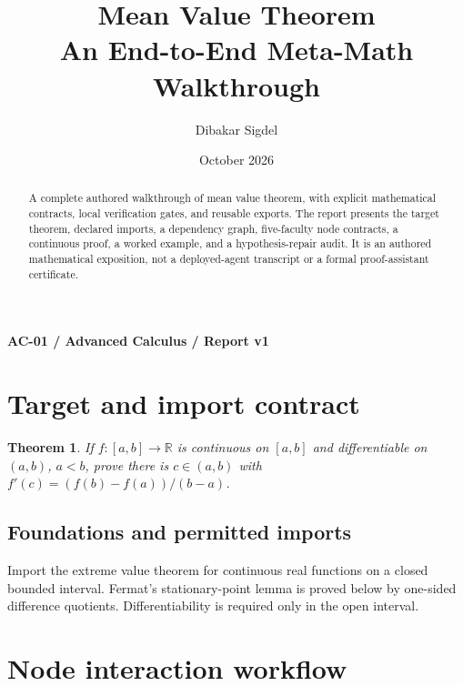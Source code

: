 \documentclass[preprint,12pt,aps,pra,showkeys,amsmath,amssymb,superscriptaddress,floatfix]{revtex4-2}
\newtheorem{theorem}{Theorem}[section]
\theoremstyle{definition}
\theoremstyle{remark}
\begin{document}
\title{Mean Value Theorem\\[4pt]\large An End-to-End Meta-Math Walkthrough}

\author{Dibakar Sigdel}


\date{October 2026}

\begin{abstract}

A complete authored walkthrough of mean value theorem, with explicit
mathematical contracts, local verification gates, and reusable exports.
The report presents the target theorem, declared imports, a dependency
graph, five-faculty node contracts, a continuous proof, a worked
example, and a hypothesis-repair audit. It is an authored mathematical
exposition, not a deployed-agent transcript or a formal proof-assistant
certificate.

\end{abstract}\maketitle\linespread{1.12}\selectfont

\noindent\textbf{AC-01 / Advanced Calculus / Report v1}

\section{Target and import contract}

\begin{theorem}

If \(f:[a,b]\to\mathbb R\) is continuous on \([a,b]\) and differentiable
on \((a,b)\), \(a<b\), prove there is \(c\in(a,b)\) with
\(f'(c)=(f(b)-f(a))/(b-a)\).

\end{theorem}

\subsection{Foundations and permitted imports}

Import the extreme value theorem for continuous real functions on a
closed bounded interval. Fermat's stationary-point lemma is proved below
by one-sided difference quotients. Differentiability is required only in
the open interval.

\clearpage\section{Node interaction workflow}
\end{document}
